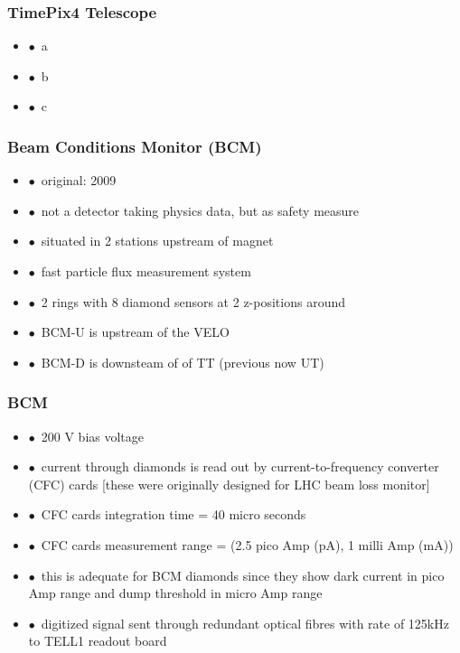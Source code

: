 \documentclass[aspectratio=1610, 12pt, xcolor=dvipsnames]{beamer}
\begin{document}
\begin{frame}\frametitle{TimePix4 Telescope}
  \begin{itemize}
    \item $\bullet$\, a
    \item $\bullet$\, b
    \item $\bullet$\, c
  \end{itemize}
\end{frame}

\begin{frame}\frametitle{Beam Conditions Monitor (BCM)}
  \begin{itemize}
    \item $\bullet$\, original: 2009 
    \item $\bullet$\, not a detector taking physics data, but as safety measure
    \item $\bullet$\, situated in 2 stations upstream of magnet
    \item $\bullet$\, fast particle flux measurement system
    \item $\bullet$\, 2 rings with 8 diamond sensors at 2 z-positions around
    \item $\bullet$\, BCM-U is upstream of the VELO
    \item $\bullet$\, BCM-D is downsteam of of TT (previous \to now UT)
  \end{itemize}
\end{frame}

\begin{frame}\frametitle{BCM}
  \begin{itemize}
    \item $\bullet$\, 200 V bias voltage
    \item $\bullet$\, current through diamonds is read out by current-to-frequency converter (CFC) cards [these were originally designed for LHC beam loss monitor]
    \item $\bullet$\, CFC cards integration time = 40 micro seconds
    \item $\bullet$\, CFC cards measurement range = (2.5 pico Amp (pA), 1 milli Amp (mA))
    \item $\bullet$\, \to this is adequate for BCM diamonds since they show dark current in pico Amp range and dump threshold in micro Amp range
    \item $\bullet$\, digitized signal sent through redundant optical fibres with rate of 125kHz to TELL1 readout board
  \end{itemize}
\end{frame}
\end{document}
